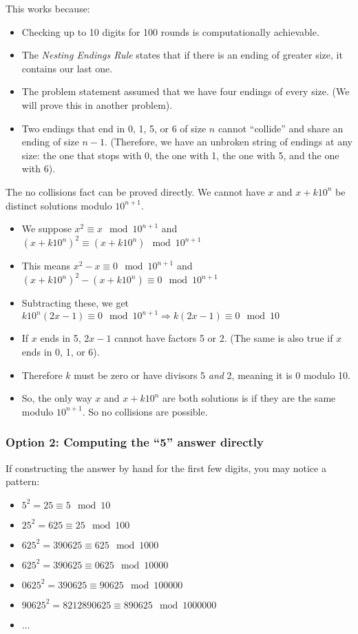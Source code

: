 \documentclass[11pt, oneside]{article} 	%
\begin{document}
This works because:
\begin{itemize}
\item Checking up to 10 digits for 100 rounds is computationally achievable.
\item The \emph{Nesting Endings Rule} states that if there is an ending of greater size, it contains our last one.
\item The problem statement assumed that we have four endings of every size.  (We will prove this in another problem).
\item Two endings that end in 0, 1, 5, or 6 of size $n$ cannot ``collide'' and share an ending of size $n-1$.   (Therefore, we have an unbroken string of endings at any size: the one that stops with 0, the one with 1, the one with 5, and the one with 6).
\end{itemize}

The no collisions fact can be proved directly.  We cannot have $x$ and $x+k10^n$ be distinct solutions modulo $10^{n+1}$.
\begin{itemize}
\item We suppose $x^2 \equiv x \mod 10^{n+1}$ and $(x+k10^n)^2 \equiv (x + k10^n) \mod 10^{n+1}$
\item This means $x^2 - x \equiv 0 \mod 10^{n+1}$ and $(x+k10^n)^2 - (x + k10^n) \equiv 0 \mod 10^{n+1}$
\item Subtracting these, we get $k10^n(2x - 1) \equiv 0 \mod 10^{n+1} \Rightarrow k(2x-1) \equiv 0 \mod 10$
\item If $x$ ends in 5, $2x - 1$ cannot have factors 5 or 2.  (The same is also true if $x$ ends in 0, 1, or 6).
\item Therefore $k$ must be zero or have divisors 5 \emph{and} 2, meaning it is $0$ modulo 10.
\item So, the only way $x$ and $x+k10^n$ are both solutions is if they are the same modulo $10^{n+1}$.  So no collisions are possible.
\end{itemize}



\subsubsection{Option 2: Computing the ``5'' answer directly}

If constructing the answer by hand for the first few digits, you may notice a pattern:
\begin{itemize}
\item $5^2 = 25 \equiv 5 \mod 10$
\item $25^2 = 625 \equiv 25 \mod 100$
\item $625^2 = 390625 \equiv 625 \mod 1000$
\item $625^2  = 390625 \equiv 0625 \mod 10000$
\item $0625^2  = 390625 \equiv 90625 \mod 100000$
\item $90625^2 = 8212890625 \equiv 890625 \mod 1000000$
\item ...
\end{itemize}
\end{document}
